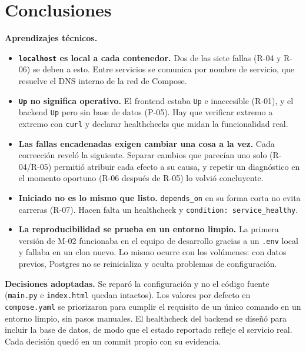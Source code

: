 \documentclass[11pt,a4paper]{article}
\newcommand{\cod}[1]{\texttt{#1}}
\begin{document}
\section{Conclusiones}

\textbf{Aprendizajes técnicos.}
\begin{itemize}
  \item \textbf{\cod{localhost} es local a cada contenedor.} Dos de las siete fallas (R-04 y R-06) se deben a esto. Entre servicios se comunica por nombre de servicio, que resuelve el DNS interno de la red de Compose.
  \item \textbf{\cod{Up} no significa operativo.} El frontend estaba \cod{Up} e inaccesible (R-01), y el backend \cod{Up} pero sin base de datos (P-05). Hay que verificar extremo a extremo con \cod{curl} y declarar healthchecks que midan la funcionalidad real.
  \item \textbf{Las fallas encadenadas exigen cambiar una cosa a la vez.} Cada corrección reveló la siguiente. Separar cambios que parecían uno solo (R-04/R-05) permitió atribuir cada efecto a su causa, y repetir un diagnóstico en el momento oportuno (R-06 después de R-05) lo volvió concluyente.
  \item \textbf{Iniciado no es lo mismo que listo.} \cod{depends\_on} en su forma corta no evita carreras (R-07). Hacen falta un healthcheck y \cod{condition: service\_healthy}.
  \item \textbf{La reproducibilidad se prueba en un entorno limpio.} La primera versión de M-02 funcionaba en el equipo de desarrollo gracias a un \cod{.env} local y fallaba en un clon nuevo. Lo mismo ocurre con los volúmenes: con datos previos, Postgres no se reinicializa y oculta problemas de configuración.
\end{itemize}

\textbf{Decisiones adoptadas.} Se reparó la configuración y no el código fuente (\cod{main.py} e \cod{index.html} quedan intactos). Los valores por defecto en \cod{compose.yaml} se priorizaron para cumplir el requisito de un único comando en un entorno limpio, sin pasos manuales. El healthcheck del backend se diseñó para incluir la base de datos, de modo que el estado reportado refleje el servicio real. Cada decisión quedó en un commit propio con su evidencia.
\end{document}
